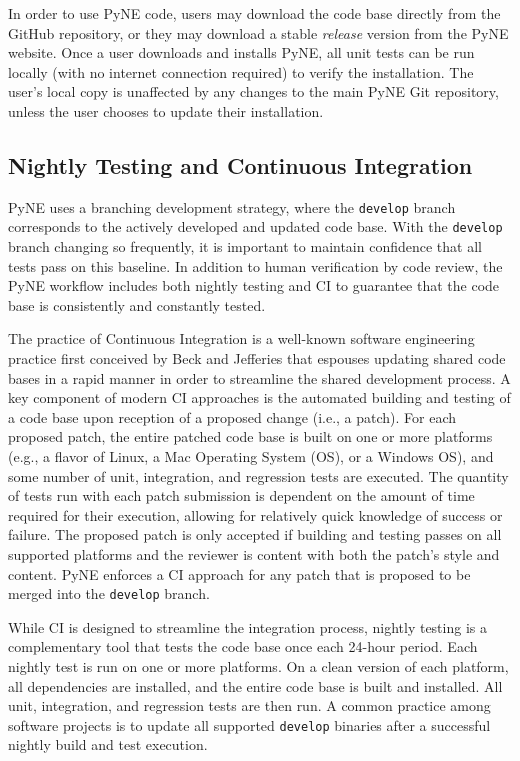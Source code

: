 \documentclass{anstrans}
\begin{document}
In order to use PyNE code, users may download the code base directly from the GitHub repository, or
they may download a stable \emph{release} version from the PyNE website. Once a
user downloads and installs PyNE, all unit tests can be run locally
(with no internet connection required) to verify the installation. The user's local
copy is unaffected by any changes to the main PyNE Git repository, unless the
user chooses to update their installation.

\subsection{Nightly Testing and Continuous Integration} 

PyNE uses a branching
development strategy, where the \texttt{develop} branch corresponds to the
actively developed and updated code base.
With the \texttt{develop} branch changing so frequently, it is important to maintain confidence that all tests pass on this baseline.
In addition to human verification by code review, the PyNE
workflow includes both nightly testing and CI to
guarantee that the code base is consistently and constantly tested.

The practice of Continuous Integration is a well-known software engineering
practice first conceived by Beck and Jefferies \cite{beck1998extreme} that
espouses updating shared code bases in a rapid manner in order to streamline the
shared development process. A key component of modern CI approaches is the
automated building and testing of a code base upon reception of a proposed
change (i.e., a patch). For each proposed patch, the entire patched code base is
built on one or more platforms (e.g., a flavor of Linux, a Mac Operating System
(OS), or a Windows OS), and some number of unit, integration, and regression
tests are executed. The quantity of tests run with each patch submission is
dependent on the amount of time required for their execution, allowing for
relatively quick knowledge of success or failure. The proposed patch is only
accepted if building and testing passes on all supported platforms and the
reviewer is content with both the patch's style and content. PyNE enforces a CI
approach for any patch that is proposed to be merged into the \texttt{develop}
branch.

While CI is designed to streamline the integration process, nightly testing is a
complementary tool that tests the code base once each 24-hour
period. Each nightly test is run on one or more platforms. On a clean version of
each platform, all dependencies are installed, and the entire code base is built
and installed. All unit, integration, and regression tests are then run. 
A common practice among software projects is to update all supported \texttt{develop}
binaries after a successful nightly build and test execution.
\end{document}
